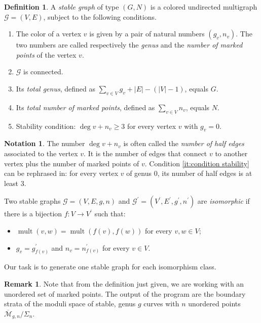 \documentclass{amsart}
\theoremstyle{plain}
\theoremstyle{definition}
\newtheorem{remark}[theorem]{Remark}
\newtheorem{definition}[theorem]{Definition}
\newtheorem{notation}[theorem]{Notation}
\DeclareMathOperator{\mult}{mult}
\newcommand{\graph}{\mathcal{G}}
\newcommand{\abs}[1]{\left|#1\right|}
\begin{document}
\begin{definition}\label{def:stable graph}
  A \emph{stable graph\/} of type $(G, N)$ is a colored undirected
  multigraph $\graph = (V, E)$, subject to the following conditions.
  \begin{enumerate}
  \item The color of a vertex $v$ is given by a pair of natural
    numbers $(g_v, n_v)$. The two numbers are called respectively the
    \emph{genus} and the \emph{number of marked points} of the vertex
    $v$.
  \item\label{it:condition connected} $\graph$ is connected.
  \item\label{it:condition genus} Its \emph{total genus}, defined as
    $\sum_{v \in V} g_v + \abs{E} - (\abs{V} - 1)$, equals $G$.
  \item Its \emph{total number of marked points}, defined as $\sum_{v
      \in V} n_v$, equals $N$.
  \item\label{it:condition stability} Stability condition: $\deg v +
    n_v \geq 3$ for every vertex $v$ with $g_v = 0$.
  \end{enumerate}
\end{definition}

\begin{notation}
  The number $\deg v + n_v$ is often called the \emph{number of half
    edges} associated to the vertex $v$. It is the number of edges
  that connect $v$ to another vertex plus the number of marked points
  of $v$. Condition \ref{it:condition stability} can be rephrased in:
  for every vertex $v$ of genus $0$, its number of half edges is at
  least $3$.
\end{notation}

Two stable graphs $\graph = (V, E, g, n)$ and $\graph^\prime =
(V^\prime, E^\prime, g^\prime, n^\prime)$ are \emph{isomorphic\/} if
there is a bijection $f\colon V \to V^\prime$ such that:
\begin{itemize}
\item $\mult(v, w) = \mult(f(v), f(w))$ for every $v, w \in V$;
\item $g_v = g^\prime_{f(v)}$ and $n_v = n^\prime_{f(v)}$ for every $v
  \in V$.
\end{itemize}
Our task is to generate one stable graph for each isomorphism class.

\begin{remark}
  Note that from the definition just given, we are working with an
  unordered set of marked points. The output of the program are the
  boundary strata of the moduli space of stable, genus $g$ curves with
  $n$ unordered points $\overline{\mathcal{M}}_{g,n}/ \Sigma_n$.
\end{remark}
\end{document}
